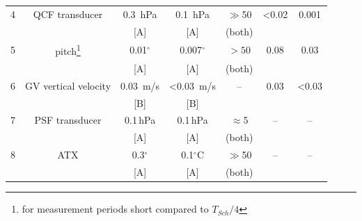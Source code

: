 \documentclass[12pt,twoside,english]{article}\usepackage[]{graphicx}\usepackage[]{color}
\providecommand{\tabularnewline}{\\}
\begin{document}
\begin{table}
\begin{minipage}[t]{1\columnwidth}
\begin{tabular}{ccccccc}
\midrule 
4  &
QCF transducer  &
0.3~hPa  &
0.1~hPa  &
$\gg$50 & 
<0.02  &
0.001\tabularnewline
 & &[A]&[A]&(both)\tabularnewline
\midrule 
5  &
pitch\footnote{for measurement periods short compared to $T_{Sch}/4$}  &
0.01$^{\circ}$  &
0.007$^{\circ}$  &
 $>50$&
0.08  &
0.03\tabularnewline
 & &[A]&[A]&(both)\tabularnewline
\midrule 
6  &
GV vertical velocity  &
0.03~m/s  &
<0.03~m/s  &
 --&
0.03  &
<0.03\tabularnewline
 & &[B]&[B]\tabularnewline
\midrule 
7  &
PSF transducer  &
0.1\,hPa  &
0.1\,hPa  &
 $\approx$5&
--  &
--\tabularnewline
 & &[A]&[A]&(both)\tabularnewline
\midrule 
8  &
ATX  &
0.3$^{\circ}$  &
0.1$^{\circ}$C  &
 $\gg$50&
--  &
--\tabularnewline
& &[A]&[A]&(both)\tabularnewline
\bottomrule
\end{tabular}
\end{minipage}
\end{table}
\end{document}
